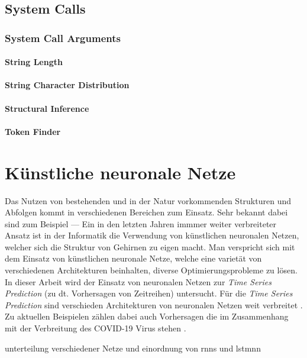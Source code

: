         \subsection{System Calls}
        \subsubsection{System Call Arguments}
        \paragraph{String Length}
        \paragraph{String Character Distribution}
        \paragraph{Structural Inference}
        \paragraph{Token Finder}
        
    \section{Künstliche neuronale Netze}
        
        Das Nutzen von bestehenden und in der Natur vorkommenden Strukturen und Abfolgen kommt in verschiedenen Bereichen zum Einsatz.
        Sehr bekannt dabei sind zum Beispiel ---
        Ein in den letzten Jahren immmer weiter verbreiteter Ansatz ist in der Informatik die Verwendung von künstlichen neuronalen Netzen, welcher sich die Struktur von Gehirnen zu eigen macht.
        Man verspricht sich mit dem Einsatz von künstlichen neuronale Netze, welche eine varietät von verschiedenen Architekturen beinhalten, diverse Optimierungsprobleme zu lösen.
        In dieser Arbeit wird der Einsatz von neuronalen Netzen zur \textit{Time Series Prediction} (zu dt. Vorhersagen von Zeitreihen) untersucht.
        Für die \textit{Time Series Prediction} sind verschieden Architekturen von neuronalen Netzen weit verbreitet \cite{BENIDIS2020}.
        Zu aktuellen Beispielen zählen dabei auch Vorhersagen die im Zusammenhang mit der Verbreitung des COVID-19 Virus stehen \cite{COVID1} \cite{COVID2} \cite{COVID3}.

        unterteilung verschiedener Netze und einordnung von rnns und lstmnn
        
